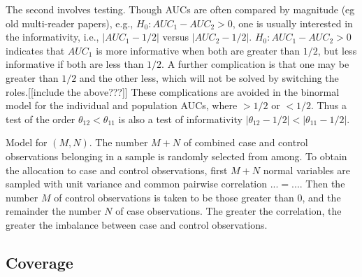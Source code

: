 \message{ !name(manuscript.tex)}\documentclass[12pt]{article}
\DeclareMathOperator{\AUC}{AUC}
\newcommand{\cind}{\perp \!\!\! \perp}
\newcommand{\aucindiv}{\theta_{11}}%
\newcommand{\aucpop}{\theta_{12}}%
\begin{document}
The second involves testing. Though AUCs are often compared by
magnitude (eg old multi-reader papers), e.g., $H_0:AUC_1-AUC_2>0$, one
is usually interested in the informativity, i.e., $|AUC_1-1/2|$ versus
$|AUC_2-1/2|$. $H_0:AUC_1-AUC_2>0$ indicates that $AUC_1$ is more
informative when both are greater than $1/2$, but less informative if
both are less than $1/2$.  A further complication is that one may be
greater than $1/2$ and the other less, which will not be solved by
switching the roles.[[include the above???]] These complications are
avoided in the binormal model for the individual and population AUCs,
where $>1/2$ or $<1/2$. Thus a test of the order $\aucpop<\aucindiv$
is also a test of informativity $|\aucpop-1/2|<|\aucindiv-1/2|$.

Model for $(M,N)$. The number $M+N$ of combined case and control
observations belonging in a sample is randomly selected from among. To
obtain the allocation to case and control observations, first $M+N$
normal variables are sampled with unit variance and common pairwise
correlation $...= ...$. Then the number $M$ of control observations is
taken to be those greater than $0$, and the remainder the number $N$
of case observations. The greater the correlation, the greater the
imbalance between case and control observations.

\subsection{Coverage}
\end{document}
